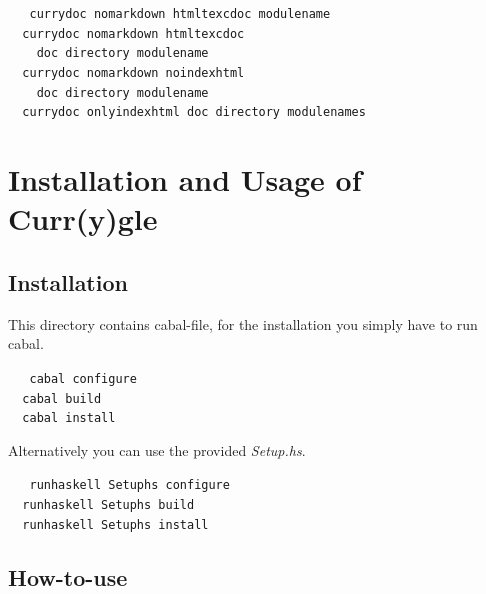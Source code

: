 \documentclass[%
	latex,%
	a4paper,%
	oneside,%
	chapterprefix,%
	headsepline,%
	12pt%
]{scrbook}
\begin{document}
\begin{tabbing}\tt
~~currydoc~nomarkdown~htmltexcdoc~modulename\\
\tt ~~currydoc~nomarkdown~htmltexcdoc~\\
\tt ~~~~doc~directory~modulename\\
\tt ~~currydoc~nomarkdown~noindexhtml~\\
\tt ~~~~doc~directory~modulename\\
\tt ~~currydoc~onlyindexhtml~doc~directory~modulenames
\end{tabbing}

\chapter{Installation and Usage of Curr(y)gle}\label{currysearch}

\section{Installation}

This directory contains cabal-file, for the installation you simply
have to run cabal.

\begin{tabbing}\tt
~~cabal~configure~\\
\tt ~~cabal~build~\\
\tt ~~cabal~install
\end{tabbing}

Alternatively you can use the provided \emph{Setup.hs}.
\begin{tabbing}\tt
~~runhaskell~Setuphs~configure\\
\tt ~~runhaskell~Setuphs~build\\
\tt ~~runhaskell~Setuphs~install
\end{tabbing}

\section{How-to-use}
\end{document}
